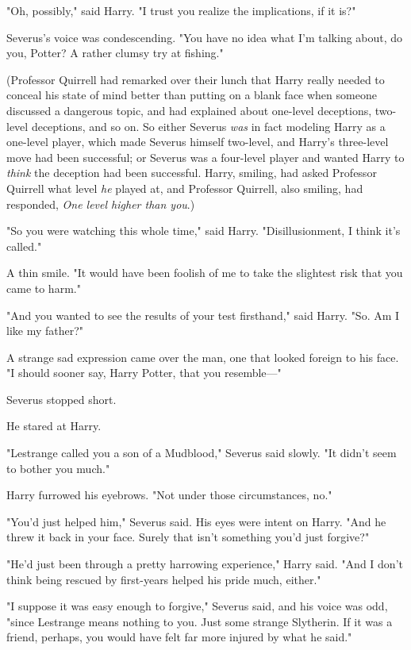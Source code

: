 "Oh, possibly," said Harry. "I trust you realize the implications, if it is?"

Severus's voice was condescending. "You have no idea what I'm talking about, do
you, Potter? A rather clumsy try at fishing."

(Professor Quirrell had remarked over their lunch that Harry really needed to
conceal his state of mind better than putting on a blank face when someone
discussed a dangerous topic, and had explained about one-level deceptions,
two-level deceptions, and so on. So either Severus \emph{was} in fact modeling
Harry as a one-level player, which made Severus himself two-level, and Harry's
three-level move had been successful; or Severus was a four-level player and
wanted Harry to \emph{think} the deception had been successful. Harry, smiling,
had asked Professor Quirrell what level \emph{he} played at, and Professor
Quirrell, also smiling, had responded, \emph{One level higher than you}.)

"So you were watching this whole time," said Harry. "Disillusionment, I think
it's called."

A thin smile. "It would have been foolish of me to take the slightest risk that
you came to harm."

"And you wanted to see the results of your test firsthand," said Harry. "So. Am
I like my father?"

A strange sad expression came over the man, one that looked foreign to his
face. "I should sooner say, Harry Potter, that you resemble\mbox{---}"

Severus stopped short.

He stared at Harry.

"Lestrange called you a son of a Mudblood," Severus said slowly. "It didn't
seem to bother you much."

Harry furrowed his eyebrows. "Not under those circumstances, no."

"You'd just helped him," Severus said. His eyes were intent on Harry. "And he
threw it back in your face. Surely that isn't something you'd just forgive?"

"He'd just been through a pretty harrowing experience," Harry said. "And I
don't think being rescued by first-years helped his pride much, either."

"I suppose it was easy enough to forgive," Severus said, and his voice was odd,
"since Lestrange means nothing to you. Just some strange Slytherin. If it was a
friend, perhaps, you would have felt far more injured by what he said."

